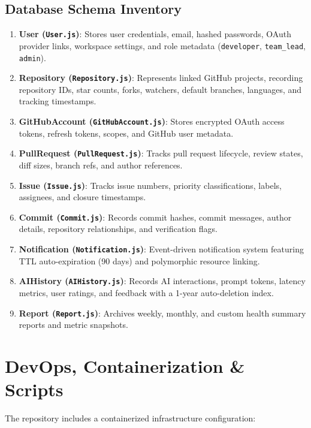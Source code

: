 \documentclass[11pt,a4paper]{article}
\begin{document}
\subsection{Database Schema Inventory}
\begin{enumerate}[leftmargin=1.5em]
    \item \textbf{User (\texttt{User.js})}: Stores user credentials, email, hashed passwords, OAuth provider links, workspace settings, and role metadata (\texttt{developer}, \texttt{team\_lead}, \texttt{admin}).
    \item \textbf{Repository (\texttt{Repository.js})}: Represents linked GitHub projects, recording repository IDs, star counts, forks, watchers, default branches, languages, and tracking timestamps.
    \item \textbf{GitHubAccount (\texttt{GitHubAccount.js})}: Stores encrypted OAuth access tokens, refresh tokens, scopes, and GitHub user metadata.
    \item \textbf{PullRequest (\texttt{PullRequest.js})}: Tracks pull request lifecycle, review states, diff sizes, branch refs, and author references.
    \item \textbf{Issue (\texttt{Issue.js})}: Tracks issue numbers, priority classifications, labels, assignees, and closure timestamps.
    \item \textbf{Commit (\texttt{Commit.js})}: Records commit hashes, commit messages, author details, repository relationships, and verification flags.
    \item \textbf{Notification (\texttt{Notification.js})}: Event-driven notification system featuring TTL auto-expiration (90 days) and polymorphic resource linking.
    \item \textbf{AIHistory (\texttt{AIHistory.js})}: Records AI interactions, prompt tokens, latency metrics, user ratings, and feedback with a 1-year auto-deletion index.
    \item \textbf{Report (\texttt{Report.js})}: Archives weekly, monthly, and custom health summary reports and metric snapshots.
\end{enumerate}

\section{DevOps, Containerization \& Scripts}

The repository includes a containerized infrastructure configuration:
\end{document}
